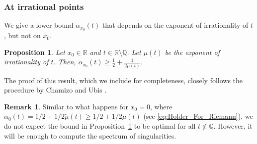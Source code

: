 \documentclass[11pt,reqno]{amsart}
\newtheorem{prop}[thm]{Proposition}
\theoremstyle{definition}
\newtheorem{rem}[thm]{Remark}
\begin{document}
\subsubsection{At irrational points}\label{sec:Lower_Holder_Irrationals}
We give a lower bound $\alpha_{x_0}(t)$ that depends on the exponent of irrationality of $t$, but not on $x_0$.

\begin{prop}\label{thm:Lower_Bound_For_Holder_Regularity}
Let $x_0 \in \mathbb R$ and $t \in \mathbb R \setminus \mathbb Q$. 
Let $\mu(t)$ be the exponent of irrationality of $t$. Then, $\alpha_{x_0}(t) \geq \frac12 + \frac1{2\mu(t)}$. 
\end{prop}
The proof of this result, which we include for completeness, 
closely follows the procedure by Chamizo and Ubis \cite[Proof of Theorem 2.3]{ChamizoUbis2014}.
\begin{rem}
Similar to what happens for $x_0 = 0$, where $\alpha_0(t) = 1/2 + 1/2\widetilde \mu(t) \geq 1/2 + 1/2\mu(t)$ %
 (see  \eqref{eq:Holder_For_Riemann}), 
we do not expect the bound in Proposition~\ref{thm:Lower_Bound_For_Holder_Regularity} 
to be optimal for all $t \not\in \mathbb Q$. 
However, it will be enough to compute the spectrum of singularities. 
\end{rem}
\end{document}
